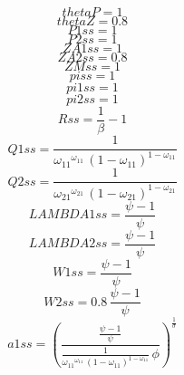 \begin{dmath*}
thetaP = 1
\end{dmath*}
\begin{dmath*}
thetaZ = 0.8
\end{dmath*}
\begin{dmath*}
P1ss = 1
\end{dmath*}
\begin{dmath*}
P2ss = 1
\end{dmath*}
\begin{dmath*}
ZA1ss = 1
\end{dmath*}
\begin{dmath*}
ZA2ss = 0.8
\end{dmath*}
\begin{dmath*}
ZMss = 1
\end{dmath*}
\begin{dmath*}
piss = 1
\end{dmath*}
\begin{dmath*}
pi1ss = 1
\end{dmath*}
\begin{dmath*}
pi2ss = 1
\end{dmath*}
\begin{dmath*}
Rss = \frac{1}{{{\beta}}}-1
\end{dmath*}
\begin{dmath*}
Q1ss = \frac{1}{{{\omega_{11}}}^{{{\omega_{11}}}}\, \left(1-{{\omega_{11}}}\right)^{1-{{\omega_{11}}}}}
\end{dmath*}
\begin{dmath*}
Q2ss = \frac{1}{{{\omega_{21}}}^{{{\omega_{21}}}}\, \left(1-{{\omega_{21}}}\right)^{1-{{\omega_{21}}}}}
\end{dmath*}
\begin{dmath*}
LAMBDA1ss = \frac{{{\psi}}-1}{{{\psi}}}
\end{dmath*}
\begin{dmath*}
LAMBDA2ss = \frac{{{\psi}}-1}{{{\psi}}}
\end{dmath*}
\begin{dmath*}
W1ss = \frac{{{\psi}}-1}{{{\psi}}}
\end{dmath*}
\begin{dmath*}
W2ss = 0.8\, \frac{{{\psi}}-1}{{{\psi}}}
\end{dmath*}
\begin{dmath*}
a1ss = \left(\frac{\frac{{{\psi}}-1}{{{\psi}}}}{\frac{1}{{{\omega_{11}}}^{{{\omega_{11}}}}\, \left(1-{{\omega_{11}}}\right)^{1-{{\omega_{11}}}}}\, {{\phi}}}\right)^{\frac{1}{{{\sigma}}}}
\end{dmath*}
